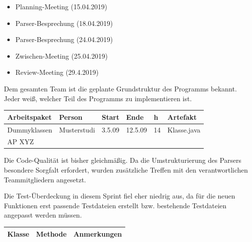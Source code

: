 \begin{itemize}
\item Planning-Meeting (15.04.2019)
\item Parser-Besprechung (18.04.2019)
\item Parser-Besprechung (24.04.2019)
\item Zwischen-Meeting (25.04.2019)
\item Review-Meeting (29.4.2019)
\end{itemize}
\nsecend%

Dem gesamten Team ist die geplante Grundstruktur des Programms bekannt. Jeder weiß, welcher Teil des Programms zu implementieren ist.
\nsecend

\begin{longtable}{|p{4cm}|l|l|l|l|l|}
        \hline
        Arbeitspaket & Person & Start & Ende & h & Artefakt\\
        \hline
        Dummyklassen & Musterstudi & 3.5.09 & 12.5.09 & 14 & Klasse.java\\ \hline
        AP XYZ &  &  &  & & \\ \hline
\end{longtable}     
\nsecend

Die Code-Qualität ist bisher gleichmäßig. Da die Umstrukturierung des Parsers besondere Sorgfalt erfordert, wurden zusätzliche Treffen mit den verantwortlichen Teammitgliedern angesetzt.
\nsecend%

Die Test-Überdeckung in diesem Sprint fiel eher niedrig aus, da für die neuen Funktionen erst passende Testdateien erstellt bzw. bestehende Testdateien angepasst werden müssen.
\nsecend%

\begin{table}[H]

\begin{tabularx}{\textwidth}{ |l|l|X| }
\hline
\textbf{Klasse} & \textbf{Methode} & \textbf{Anmerkungen}\\
 \hline
\hline
\end{tabularx}
\end{table}

